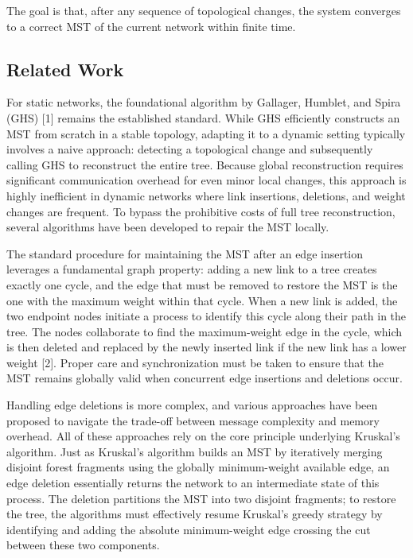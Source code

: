 \documentclass{memoir}
\begin{document}
The goal is that, after any sequence of topological changes, the system converges to a correct MST of the current network within finite time.


\subsection{Related Work}

For static networks, the foundational algorithm by Gallager, Humblet, and Spira (GHS) [1] remains the established standard. While GHS efficiently constructs an MST from scratch in a stable topology, adapting it to a dynamic setting typically involves a naive approach: detecting a topological change and subsequently calling GHS to reconstruct the entire tree. Because global reconstruction requires significant communication overhead for even minor local changes, this approach is highly inefficient in dynamic networks where link insertions, deletions, and weight changes are frequent. To bypass the prohibitive costs of full tree reconstruction, several algorithms have been developed to repair the MST locally.

The standard procedure for maintaining the MST after an edge insertion leverages a fundamental graph property: adding a new link to a tree creates exactly one cycle, and the edge that must be removed to restore the MST is the one with the maximum weight within that cycle. When a new link is added, the two endpoint nodes initiate a process to identify this cycle along their path in the tree. The nodes collaborate to find the maximum-weight edge in the cycle, which is then deleted and replaced by the newly inserted link if the new link has a lower weight [2]. Proper care and synchronization must be taken to ensure that the MST remains globally valid when concurrent edge insertions and deletions occur.

Handling edge deletions is more complex, and various approaches have been proposed to navigate the trade-off between message complexity and memory overhead. All of these approaches rely on the core principle underlying Kruskal's algorithm. Just as Kruskal's algorithm builds an MST by iteratively merging disjoint forest fragments using the globally minimum-weight available edge, an edge deletion essentially returns the network to an intermediate state of this process. The deletion partitions the MST into two disjoint fragments; to restore the tree, the algorithms must effectively resume Kruskal's greedy strategy by identifying and adding the absolute minimum-weight edge crossing the cut between these two components.
\end{document}
